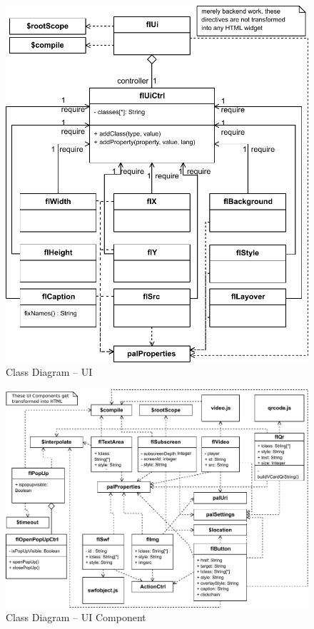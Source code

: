 \begin{figure}[htb]
    \centering
    \includegraphics{figures/design-class-ui.pdf}
    \caption{Class Diagram -- UI}
    \label{fig:class-ui}
\end{figure}

\begin{figure}
    \centering
    \includegraphics{figures/design-class-uicomponent.pdf}
    \caption{Class Diagram -- UI Component}
    \label{fig:class-uicomponent}
\end{figure}

